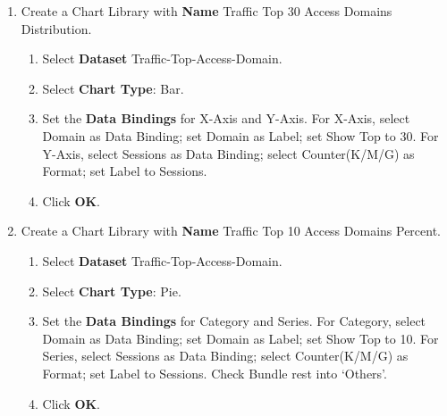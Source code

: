 \begin{description}
\begin{enumerate}
        \begin{enumerate}
            \item 	Select \textbf{Dataset} Traffic-Top-Access-Domain.
            \item 	Select \textbf{Chart Type}: Table.
            \item 	For \textbf{Data Bindings}, select Regular as Table Type. Click to add Column. Complete Title, Width, Data Binding, Format and Legend for each column. Fill in Domain as Title; select Domain as Data Binding; input Domain as Legend. Fill in Sessions as Title; select Sessions as Data Binding; select Counter(K/M/G) as Format; input Sessions as Legend. Select order by Sessions descending. Show Top 30.
            \item 	Click \textbf{OK}.
        \end{enumerate}
        \item 	Create a Chart Library with \textbf{Name} Traffic Top 30 Access Domains Distribution.
        \begin{enumerate}
            \item 	Select \textbf{Dataset} Traffic-Top-Access-Domain.
            \item 	Select \textbf{Chart Type}: Bar.
            \item 	Set the \textbf{Data Bindings} for X-Axis and Y-Axis. For X-Axis, select Domain as Data Binding; set Domain as Label; set Show Top to 30. For Y-Axis, select Sessions as Data Binding; select Counter(K/M/G) as Format; set Label to Sessions.
            \item 	Click \textbf{OK}.
        \end{enumerate}
        \item 	Create a Chart Library with \textbf{Name} Traffic Top 10 Access Domains Percent.
        \begin{enumerate}
            \item 	Select \textbf{Dataset} Traffic-Top-Access-Domain.
            \item 	Select \textbf{Chart Type}: Pie.
            \item 	Set the \textbf{Data Bindings} for Category and Series. For Category, select Domain as Data Binding; set Domain as Label; set Show Top to 10. For Series, select Sessions as Data Binding; select Counter(K/M/G) as Format; set Label to Sessions. Check Bundle rest into ‘Others’.
            \item 	Click \textbf{OK}.
        \end{enumerate}

\end{enumerate}
\end{description}
